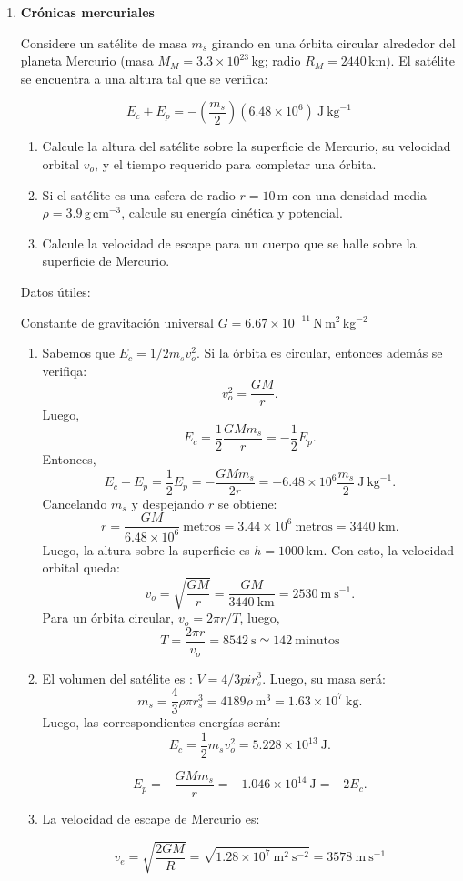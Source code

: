 \documentclass[a4paper,12pt]{article}
\begin{document}
\begin{enumerate}

\item{\bf{Crónicas mercuriales}}

Considere un satélite de masa $m_s$ girando en una órbita circular alrededor
del planeta Mercurio (masa $M_M = 3.3\times 10^{23}$\,kg; radio $R_M =
2440$\,km). El satélite se encuentra a una altura tal que se verifica:

\[E_c + E_p = -\left ( \frac{m_s}{2} \right ) \left (6.48 \times 10^6\right)
\mathrm{\ J\ kg}^{-1} \]

\begin{enumerate}
\item Calcule la altura del satélite sobre la superficie de Mercurio, su
velocidad orbital $v_o$, y el tiempo requerido para completar una órbita.
\item Si el satélite es una esfera de radio $r=10$\,m con una densidad media
$\rho =3.9$\,g\,cm$^{-3}$, calcule su energía cinética y potencial.
\item Calcule la velocidad de escape para un cuerpo que se halle sobre la
superficie de Mercurio.
\end{enumerate}

Datos útiles:

Constante de gravitación universal $G=6.67\times10^{-11}$\,N\,m$^2$\,kg$^{-2}$

\begin{enumerate}
\item Sabemos que $E_c=1/2 m_s v_o^2$. Si la órbita es circular, entonces además se verifiqa: 
\[ v_o^2 = \frac{GM}{r}. \] Luego, 
\[ E_c = \frac{1}{2} \frac{G M m_s}{r} = - \frac{1}{2} E_p.\]
Entonces, 
\[E_c+E_p = \frac{1}{2} E_p = -\frac{GM m_s}{2r} = -6.48 \times 10^6 \frac{m_s}{2} \mathrm{\ J\ kg}^{-1}. \]
Cancelando $m_s$ y despejando $r$ se obtiene: 
\[r = \frac{GM}{6.48 \times 10^6} \mathrm{\ metros} =  3.44\times 10^6\mathrm{\ metros} = 3440  \mathrm{\ km}. \]
Luego, la altura sobre la superficie es $h=1000$\,km. Con esto, la velocidad orbital queda:
\[ v_o = \sqrt{\frac{GM}{r}} = \frac{GM}{3440 \mathrm{\ km}} = 2530 \mathrm{\ m} \mathrm{\ s}^{-1}. \]
Para un órbita circular, $v_o=2\pi r/T$, luego, 
\[ T= \frac{2 \pi r}{v_o} = 8542\mathrm{\ s} \simeq 142 \mathrm{\ minutos}\]

\item El volumen del satélite es : $V=4/3 pi r_s^3$. Luego, su masa será: 
\[m_s = \frac{4}{3} \rho \pi r_s^3 = 4189 \rho \mathrm{\ m}^3 = 1.63 \times 10^7 \mathrm{\ kg}.\]
Luego, las correspondientes energías serán:
\[ E_c  = \frac{1}{2} m_s v_o^2 = 5.228\times 10^{13} \mathrm{\ J}. \]

\[ E_p  = -\frac{GM m_s}{r} = - 1.046\times 10^{14} \mathrm{\ J} = - 2 E_c. \]

\item La velocidad de escape de Mercurio es: 

\[ v_e = \sqrt{\frac{2 G M }{R}} = \sqrt{1.28 \times 10^7  \mathrm{\ m}^2 \mathrm{\ s}^{-2}} = 3578 \mathrm{\ m} \mathrm{\ s}^{-1}\] 


\end{enumerate}
\end{enumerate}
\end{document}
